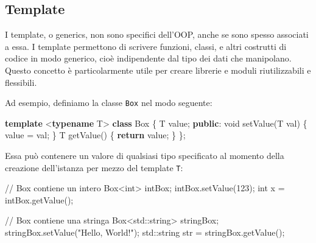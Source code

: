 \documentclass[
  letterpaper,
  DIV=11,
  numbers=noendperiod]{scrreprt}
\newenvironment{Shaded}{\begin{snugshade}}{\end{snugshade}}
\newcommand{\BuiltInTok}[1]{\textcolor[rgb]{0.00,0.23,0.31}{#1}}
\newcommand{\CommentTok}[1]{\textcolor[rgb]{0.37,0.37,0.37}{#1}}
\newcommand{\ControlFlowTok}[1]{\textcolor[rgb]{0.00,0.23,0.31}{\textbf{#1}}}
\newcommand{\DataTypeTok}[1]{\textcolor[rgb]{0.68,0.00,0.00}{#1}}
\newcommand{\DecValTok}[1]{\textcolor[rgb]{0.68,0.00,0.00}{#1}}
\newcommand{\KeywordTok}[1]{\textcolor[rgb]{0.00,0.23,0.31}{\textbf{#1}}}
\newcommand{\NormalTok}[1]{\textcolor[rgb]{0.00,0.23,0.31}{#1}}
\newcommand{\OperatorTok}[1]{\textcolor[rgb]{0.37,0.37,0.37}{#1}}
\newcommand{\StringTok}[1]{\textcolor[rgb]{0.13,0.47,0.30}{#1}}
\begin{document}
\subsection{Template}\label{template}

I template, o generics, non sono specifici dell'OOP, anche se sono
spesso associati a essa. I template permettono di scrivere funzioni,
classi, e altri costrutti di codice in modo generico, cioè indipendente
dal tipo dei dati che manipolano. Questo concetto è particolarmente
utile per creare librerie e moduli riutilizzabili e flessibili.

Ad esempio, definiamo la classe \texttt{Box} nel modo seguente:

\begin{Shaded}
\begin{Highlighting}[]
\KeywordTok{template} \OperatorTok{\textless{}}\KeywordTok{typename}\NormalTok{ T}\OperatorTok{\textgreater{}}
\KeywordTok{class}\NormalTok{ Box }\OperatorTok{\{}
\NormalTok{    T value}\OperatorTok{;}
\KeywordTok{public}\OperatorTok{:}
    \DataTypeTok{void}\NormalTok{ setValue}\OperatorTok{(}\NormalTok{T val}\OperatorTok{)} \OperatorTok{\{}\NormalTok{ value }\OperatorTok{=}\NormalTok{ val}\OperatorTok{;} \OperatorTok{\}}
\NormalTok{    T getValue}\OperatorTok{()} \OperatorTok{\{} \ControlFlowTok{return}\NormalTok{ value}\OperatorTok{;} \OperatorTok{\}}
\OperatorTok{\};}
\end{Highlighting}
\end{Shaded}

Essa può contenere un valore di qualsiasi tipo specificato al momento
della creazione dell'istanza per mezzo del template \texttt{T}:

\begin{Shaded}
\begin{Highlighting}[]
\CommentTok{// Box contiene un intero}
\NormalTok{Box}\OperatorTok{\textless{}}\DataTypeTok{int}\OperatorTok{\textgreater{}}\NormalTok{ intBox}\OperatorTok{;}
\NormalTok{intBox}\OperatorTok{.}\NormalTok{setValue}\OperatorTok{(}\DecValTok{123}\OperatorTok{);}
\DataTypeTok{int}\NormalTok{ x }\OperatorTok{=}\NormalTok{ intBox}\OperatorTok{.}\NormalTok{getValue}\OperatorTok{();}

\CommentTok{// Box contiene una stringa}
\NormalTok{Box}\OperatorTok{\textless{}}\BuiltInTok{std::}\NormalTok{string}\OperatorTok{\textgreater{}}\NormalTok{ stringBox}\OperatorTok{;}
\NormalTok{stringBox}\OperatorTok{.}\NormalTok{setValue}\OperatorTok{(}\StringTok{"Hello, World!"}\OperatorTok{);}
\BuiltInTok{std::}\NormalTok{string str }\OperatorTok{=}\NormalTok{ stringBox}\OperatorTok{.}\NormalTok{getValue}\OperatorTok{();}
\end{Highlighting}
\end{Shaded}
\end{document}
